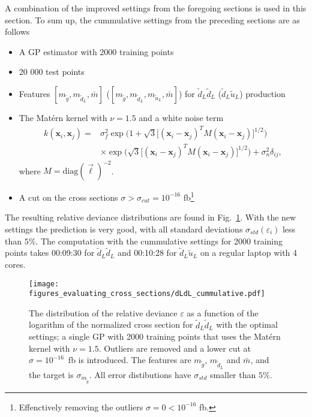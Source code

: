 \documentclass[twoside,english]{uiofysmaster}
\begin{document}
{A combination of the improved settings from the foregoing sections is used in this section. To sum up, the cummulative settings from the preceding sections are as follows
\begin{itemize}
\item A GP estimator with 2000 training points
\item 20 000 test points
\item Features $[m_{\widetilde{g}}, m_{\widetilde{d}_L}, \bar{m}]$ ($[m_{\widetilde{g}}, m_{\widetilde{d}_L}, m_{\widetilde{u}_L}, \bar{m}]$) for $\widetilde{d}_L \widetilde{d}_L$ ($\widetilde{d}_L \widetilde{u}_L$) production
\item The Mat\'{e}rn kernel with $\nu=1.5$ and a white noise term
\begin{align}
k (\textbf{x}_i, \textbf{x}_j) =& \sigma_f^2 \exp \Big( 1 + \sqrt{3} \big[ (\textbf{x}_i - \textbf{x}_j)^T M (\textbf{x}_i - \textbf{x}_j) \big]^{1/2} \Big)\\ & \times  \exp \Big( \sqrt{3} \big[ (\textbf{x}_i - \textbf{x}_j)^T M (\textbf{x}_i - \textbf{x}_j) \big]^{1/2} \Big) + \sigma_n^2 \delta_{ij},
\end{align}
where $M = \text{diag}(\vec{\ell})^{-2}$.
\item A cut on the cross sections $\sigma > \sigma_{cut} = 10^{-16}$ fb\footnote{Effenctively removing the outliers $\sigma = 0 < 10^{-16}$ fb.}
\end{itemize}
The resulting relative deviance distributions are found in Fig.~\ref{Fig:: evaluating cross : error distribution dLdL optimal}. With the new settings the prediction is very good, with all standard deviations $\sigma_{std}(\varepsilon_i)$ less than $5\%$. The computation with the cummulative settings for 2000 training points takes 00:09:30 for $\widetilde{d}_L \widetilde{d}_L$ and 00:10:28 for $\widetilde{d}_L \widetilde{u}_L$ on a regular laptop with 4 cores. 

\begin{figure}
\centering
\texttt{[image: figures\_evaluating\_cross\_sections/dLdL\_cummulative.pdf]}
\caption{The distribution of the relative deviance $\varepsilon$ as a function of the logarithm of the normalized cross section for $\widetilde{d}_L \widetilde{d}_L$ with the optimal settings; a single GP with 2000 training points that uses the Mat\'{e}rn kernel with $\nu=1.5$. Outliers are removed and a lower cut at $\sigma=10^{-16}$~fb is introduced. The features are $m_{\widetilde{g}}$, $m_{\widetilde{d}_L}$ and $\bar{m}$, and the target is $\sigma_{m_{\widetilde{g}}}$. All error distibutions have $\sigma_{std}$ smaller than $5\%$.}
\label{Fig:: evaluating cross : error distribution dLdL optimal}
\end{figure}

}
\end{document}
